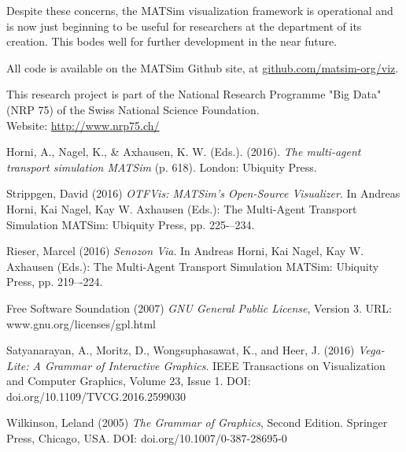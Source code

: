 \documentclass[Afour,sagev,times]{sagej}
\begin{document}
Despite these concerns, the MATSim visualization framework is operational and is now just beginning to be useful for researchers at the department of its creation. This bodes well for further development in the near future.

All code is available on the MATSim Github site, at \url{github.com/matsim-org/viz}.


\begin{acks}
This research project is part of the National Research Programme "Big Data" (NRP 75) of the Swiss National Science Foundation.\\
Website: \url{http://www.nrp75.ch/}
\end{acks}

\begin{thebibliography}{99}

Horni, A., Nagel, K., \& Axhausen, K. W. (Eds.). (2016). \textit{The multi-agent transport simulation MATSim} (p. 618). London: Ubiquity Press.

Strippgen, David (2016) \textit{OTFVis: MATSim’s Open-Source Visualizer}. In Andreas Horni, Kai Nagel, Kay W. Axhausen (Eds.): The Multi-Agent Transport Simulation MATSim: Ubiquity Press, pp. 225-–234.

Rieser, Marcel (2016) \textit{Senozon Via}. In Andreas Horni, Kai Nagel, Kay W. Axhausen (Eds.): The Multi-Agent Transport Simulation MATSim: Ubiquity Press, pp. 219–-224.

Free Software Soundation (2007) \textit{GNU General Public License}, Version 3.
URL: www.gnu.org/licenses/gpl.html

Satyanarayan, A., Moritz, D., Wongsuphasawat, K., and Heer, J. (2016) \textit{Vega-Lite: A Grammar of Interactive Graphics}. IEEE Transactions on Visualization and Computer Graphics, Volume 23, Issue 1. DOI: doi.org/10.1109/TVCG.2016.2599030

Wilkinson, Leland (2005) \textit{The Grammar of Graphics}, Second Edition. Springer Press, Chicago, USA. DOI: doi.org/10.1007/0-387-28695-0

\end{thebibliography}
\end{document}
